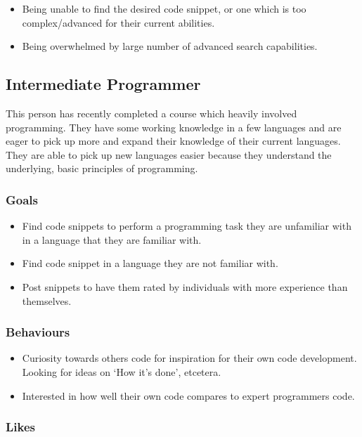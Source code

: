 \documentclass[11pt,a4paper]{article}
\begin{document}
\begin{itemize}
\item Being unable to find the desired code snippet, or one which is
too complex/advanced for their current abilities.
\item Being overwhelmed by large number of advanced search capabilities.
\end{itemize}

\newpage

\subsection{Intermediate Programmer}

This person has recently completed a course which heavily involved programming.
They have some working knowledge in a few languages and are eager to pick up
more and expand their knowledge of their current languages. They are able to
pick up new languages easier because they understand the underlying, basic
principles of programming.

\subsubsection{Goals}

\begin{itemize}
\item Find code snippets to perform a programming task they are unfamiliar
with in a language that they are familiar with.
\item Find code snippet in a language they are not familiar with.
\item Post snippets to have them rated by individuals with more experience than
themselves.
\end{itemize}

\subsubsection{Behaviours}

\begin{itemize}
\item Curiosity towards others code for inspiration for their own code
development. Looking for ideas on `How it's done', etcetera.
\item Interested in how well their own code compares to expert programmers
code.
\end{itemize}

\subsubsection{Likes}
\end{document}
